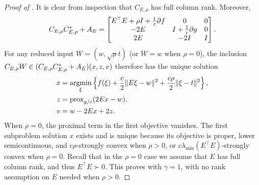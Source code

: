 \documentclass[11pt]{article}
\begin{document}
\begin{proof}[Proof of ]
    It is clear from inspection that $C_{E,\rho}$ has full column rank.
    Moreover,
    \begin{align}
        {C}_{E,\rho}{C}_{E,\rho}^*+{A}_E
        =\begin{bmatrix}
             E^\top E+\rho I+\frac{1}{c}\partial f & 0 & 0 \\
            -2E & I+\frac{1}{c}\partial g & 0 \\
            2E & -2I & I
        \end{bmatrix}.
    \end{align}
    For any reduced input $W=(w,\sqrt{\rho}t)$ (or $W=w$ when $\rho=0$), the inclusion
    ${C}_{E,\rho} W\in({C}_{E,\rho}{C}_{E,\rho}^*+{A}_E)(x,z,v)$ therefore has the unique solution
    \begin{align}
        x&=\mathop{\rm argmin}_{\xi}\left\{f(\xi)+\frac{c}{2}\lVert E\xi-w\rVert^2+\frac{c\rho}{2}\lVert\xi-t\rVert^2\right\}, \\
        z&=\mathrm{prox}_{g/c}(2Ex-w), \\
        v&=w-2Ex+2z.
    \end{align}
    When $\rho=0$, the proximal term in the first objective vanishes.
    The first subproblem solution $x$ exists and is unique because its objective is proper, lower semicontinuous, and $c\rho$-strongly convex when $\rho>0$, or $c\lambda_{\min}(E^\top E)$-strongly convex when $\rho=0$.
    Recall that in the $\rho=0$ case we assume that $E$ has full column rank, and thus $E^\top E\succ 0$.
    This proves  with $\gamma=1$, with no rank assumption on $E$ needed when $\rho>0$.


\end{proof}
\end{document}
